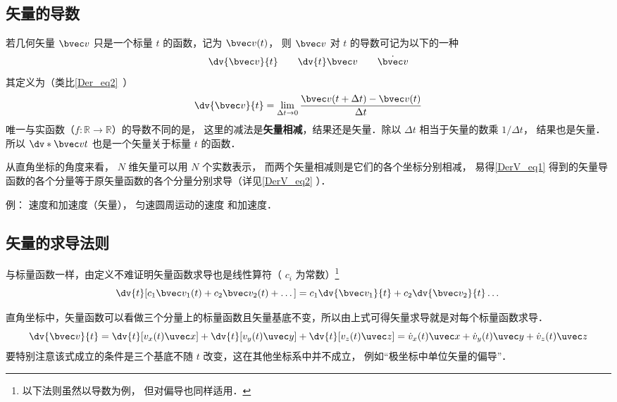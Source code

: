 
\begin{issues}
\end{issues}



\subsection{矢量的导数}

若几何矢量 $\bvec v$ 只是一个标量 $t$ 的函数，记为 $\bvec v(t)$， 则 $\bvec v$ 对 $t$ 的导数可记为以下的一种
\begin{equation}
\dv{\bvec v}{t} \qquad \dv{t}\bvec v \qquad \dot{\bvec v}
\end{equation}
其定义为（类比\autoref{Der_eq2}~）
\begin{equation}\label{DerV_eq1}
\dv{\bvec v}{t} = \lim_{\Delta t \to 0} \frac{\bvec v ( t + \Delta t) - \bvec v(t)}{\Delta t}
\end{equation}
唯一与实函数（$f:\mathbb R \to \mathbb R$）的导数不同的是， 这里的减法是\textbf{矢量相减}，结果还是矢量．除以 $\Delta t$ 相当于矢量的数乘 $1/\Delta t$， 结果也是矢量． 所以 $\dv*{\bvec v}{t}$ 也是一个矢量关于标量 $t$ 的函数．

从直角坐标的角度来看， $N$ 维矢量可以用 $N$ 个实数表示， 而两个矢量相减则是它们的各个坐标分别相减， 易得\autoref{DerV_eq1} 得到的矢量导函数的各个分量等于原矢量函数的各个分量分别求导（详见\autoref{DerV_eq2} ）．

例： 速度和加速度（矢量）， 匀速圆周运动的速度 和加速度．

\subsection{矢量的求导法则}
与标量函数一样，由定义不难证明矢量函数求导也是线性算符（ $c_i$ 为常数）\footnote{以下法则虽然以导数为例， 但对偏导也同样适用．}
\begin{equation}
\dv{t}[c_1 \bvec v_1(t) + c_2 \bvec v_2(t) + \dots] = c_1\dv{\bvec v_1}{t} + c_2\dv{\bvec v_2}{t} \dots
\end{equation}

直角坐标中，矢量函数可以看做三个分量上的标量函数且矢量基底不变，所以由上式可得矢量求导就是对每个标量函数求导．
\begin{equation}\label{DerV_eq2}
\dv{\bvec v}{t} = \dv{t}[v_x(t)\uvec x] + \dv{t}[v_y(t)\uvec y] + \dv{t}[v_z(t)\uvec z]
= \dot v_x(t)\uvec x + \dot v_y(t)\uvec y + \dot v_z(t)\uvec z
\end{equation}
要特别注意该式成立的条件是三个基底不随 $t$ 改变，这在其他坐标系中并不成立， 例如“极坐标中单位矢量的偏导”．

